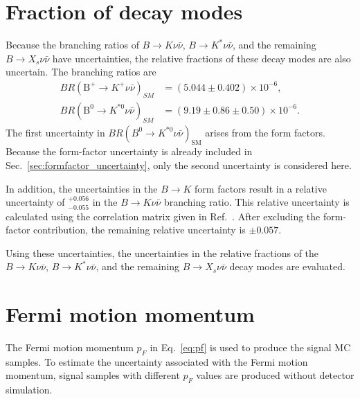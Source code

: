 \section{Fraction of decay modes}
Because the branching ratios of $B\rightarrow K\nu\bar{\nu}$, $B\rightarrow K^{*}\nu\bar{\nu}$, and the remaining $B\rightarrow X_{s}\nu\bar{\nu}$ have uncertainties, the relative fractions of these decay modes are also uncertain.
The branching ratios are~\cite{Buras:2014fpa,Parrott:2022zte}
\begin{align}
  BR(\textrm{B}^{+}\rightarrow K^{+}\nu \bar{\nu})_{SM}&=(5.044 \pm 0.402) \times 10^{-6},\\
  BR(\textrm{B}^{0}\rightarrow K^{*0}\nu \bar{\nu})_{SM}&=(9.19 \pm 0.86 \pm 0.50) \times 10^{-6}.
\end{align}
The first uncertainty in $BR(B^{0}\rightarrow K^{*0}\nu\bar{\nu})_{\mathrm{SM}}$ arises from the form factors.
Because the form-factor uncertainty is already included in Sec.~\ref{sec:formfactor_uncertainty}, only the second uncertainty is considered here.

In addition, the uncertainties in the $B\rightarrow K$ form factors result in a relative uncertainty of $^{+0.056}_{-0.055}$ in the $B\rightarrow K\nu\bar{\nu}$ branching ratio.
This relative uncertainty is calculated using the correlation matrix given in Ref.~\cite{Parrott:2022rgu}.
After excluding the form-factor contribution, the remaining relative uncertainty is $\pm 0.057$.

Using these uncertainties, the uncertainties in the relative fractions of the $B\rightarrow K\nu\bar{\nu}$, $B\rightarrow K^{*}\nu\bar{\nu}$, and the remaining $B\rightarrow X_{s}\nu\bar{\nu}$ decay modes are evaluated.

\section{Fermi motion momentum}
The Fermi motion momentum $p_{F}$ in Eq.~\ref{eq:pf} is used to produce the signal MC samples.
To estimate the uncertainty associated with the Fermi motion momentum, signal samples with different $p_{F}$ values are produced without detector simulation.

